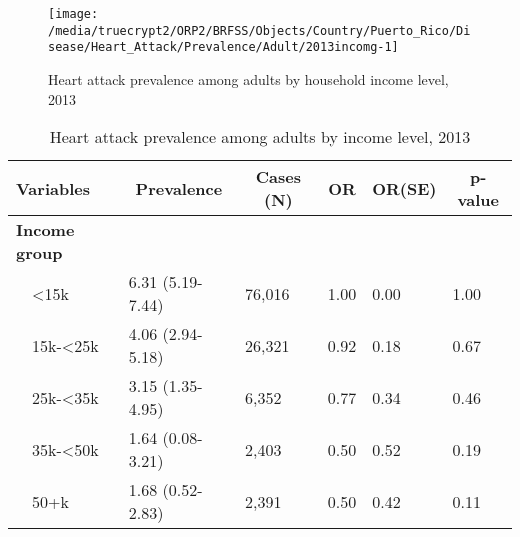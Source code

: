  
 
 \newpage
{}

\begin{figure}[H]
\caption{Heart attack prevalence among adults by household income level, 
         2013}
\begin{knitrout}
\color{fgcolor}

{\centering \texttt{[image: /media/truecrypt2/ORP2/BRFSS/Objects/Country/Puerto\_Rico/Disease/Heart\_Attack/Prevalence/Adult/2013incomg-1]} 

}


\end{knitrout}
 \label{fig:income.Heart_Attack.2013}
\end{figure}

\begin{table}[H]
\caption{Heart attack prevalence  among adults by income level, 2013\label{tab:income.Heart_Attack.2013}} 
\begin{center}
\begin{tabular}{llllll}
\hline\hline
\multicolumn{1}{l}{Variables}&\multicolumn{1}{c}{Prevalence}&\multicolumn{1}{c}{Cases (N)}&\multicolumn{1}{c}{OR}&\multicolumn{1}{c}{OR(SE)}&\multicolumn{1}{c}{p-value}\tabularnewline
\hline
{\bfseries Income group}&&&&&\tabularnewline
~~\textless15k&6.31 (5.19-7.44)&76,016&1.00&0.00&1.00\tabularnewline
~~15k-\textless25k&4.06 (2.94-5.18)&26,321&0.92&0.18&0.67\tabularnewline
~~25k-\textless35k&3.15 (1.35-4.95)& 6,352&0.77&0.34&0.46\tabularnewline
~~35k-\textless50k&1.64 (0.08-3.21)& 2,403&0.50&0.52&0.19\tabularnewline
~~50+k&1.68 (0.52-2.83)& 2,391&0.50&0.42&0.11\tabularnewline
\hline
\end{tabular}\end{center}

\end{table}

